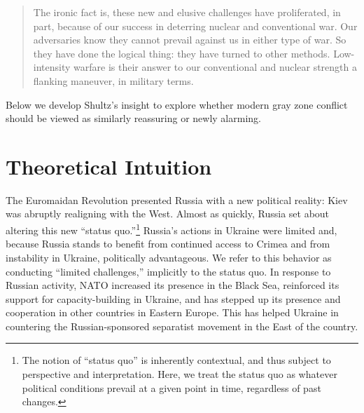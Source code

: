 \documentclass[
]{article}
\begin{document}
\begin{quote}
The ironic fact is, these new and elusive challenges have proliferated, in part, because of our success in deterring nuclear and conventional war. Our adversaries know they cannot prevail against us in either type of war. So they have done the logical thing: they have turned to other methods. Low-intensity warfare is their answer to our conventional and nuclear strength a flanking maneuver, in military terms.
\end{quote}

Below we develop Shultz's insight to explore whether modern gray zone conflict should be viewed as similarly reassuring or newly alarming.

\hypertarget{theoretical-intuition}{%
\section{Theoretical Intuition}\label{theoretical-intuition}}

The Euromaidan Revolution presented Russia with a new political reality: Kiev was abruptly realigning with the West. Almost as quickly, Russia set about altering this new ``status quo.''\footnote{The notion of ``status quo'' is inherently contextual, and thus subject to perspective and interpretation. Here, we treat the status quo as whatever political conditions prevail at a given point in time, regardless of past changes.} Russia's actions in Ukraine were limited and, because Russia stands to benefit from continued access to Crimea and from instability in Ukraine, politically advantageous. We refer to this behavior as conducting ``limited challenges,'' implicitly to the status quo. In response to Russian activity, NATO increased its presence in the Black Sea, reinforced its support for capacity-building in Ukraine, and has stepped up its presence and cooperation in other countries in Eastern Europe. This has helped Ukraine in countering the Russian-sponsored separatist movement in the East of the country.
\end{document}
